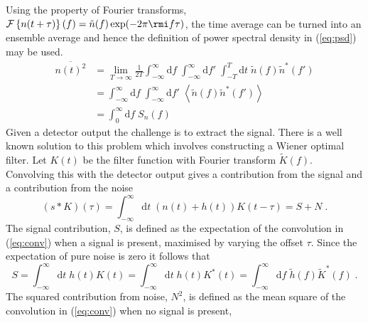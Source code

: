 Using the property of Fourier transforms, ${\cal{F}}\left\{ n(t+\tau) \right\}(f)=\tilde{n}(f)\exp (-2\pi \rmi f\tau )$, the time average can be turned into an ensemble average and hence the definition of power spectral density in (\ref{eq:psd}) may be used.
\begin{eqnarray}\label{eq:meansquare1}
\overline{n(t)^{2}}& = \lim_{T\rightarrow\infty}\frac{1}{2T}\int_{-\infty}^{\infty}\textrm{d}f\;\int_{-\infty}^{\infty}\textrm{d}f'\;\int_{-T}^{T}\textrm{d}t\; \tilde{n}(f)\tilde{n}^{*}(f') \nonumber \\
&=\int_{-\infty}^{\infty}\textrm{d}f\;\int_{-\infty}^{\infty}\textrm{d}f'\;\left<\tilde{n}(f)\tilde{n}^{*}(f')\right>\nonumber \\
& = \int_{0}^{\infty}\textrm{d}f\; S_{n}(f)
\end{eqnarray}
Given a detector output the challenge is to extract the signal. There is a well known solution to this problem which involves constructing a Wiener optimal filter. Let $K(t)$ be the filter function with Fourier transform $\tilde{K}(f)$.
Convolving this with the detector output gives a contribution from the signal and a contribution from the noise
\begin{equation}\label{eq:conv} \left(s*K\right)(\tau)=\int_{-\infty}^{\infty}\textrm{d}t\;(n(t)+h(t))K(t-\tau)=S+N\; .\end{equation}
The signal contribution, $S$, is defined as the expectation of the convolution in (\ref{eq:conv}) when a signal is present, maximised by varying the offset $\tau$. Since the expectation of pure noise is zero it follows that
\begin{equation} S = \int_{-\infty}^{\infty}\textrm{d}t\;h(t)K(t)=\int_{-\infty}^{\infty}\textrm{d}t\;h(t)K^{*}(t)=\int_{-\infty}^{\infty}\textrm{d}f\; \tilde{h}(f)\tilde{K}^{*}(f) \; .\end{equation}
The squared contribution from noise, $N^{2}$, is defined as the mean square of the convolution in (\ref{eq:conv}) when no signal is present,
